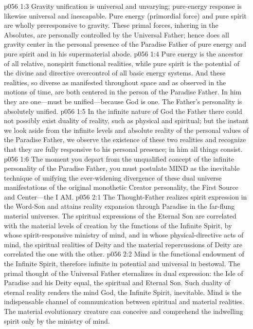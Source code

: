 \vs p056 1:3 Gravity unification is universal and unvarying; pure\hyp{}energy response is likewise universal and inescapable. Pure energy (primordial force) and pure spirit are wholly preresponsive to gravity. These primal forces, inhering in the Absolutes, are personally controlled by the Universal Father; hence does all gravity center in the personal presence of the Paradise Father of pure energy and pure spirit and in his supermaterial abode.
\pc \vs p056 1:4 Pure energy is the ancestor of all relative, nonspirit functional realities, while pure spirit is the potential of the divine and directive overcontrol of all basic energy systems. And these realities, so diverse as manifested throughout space and as observed in the motions of time, are both centered in the person of the Paradise Father. In him they are one---must be unified---because God is one. The Father’s personality is absolutely unified.
\vs p056 1:5 In the infinite nature of God the Father there could not possibly exist duality of reality, such as physical and spiritual; but the instant we look aside from the infinite levels and absolute reality of the personal values of the Paradise Father, we observe the existence of these two realities and recognize that they are fully responsive to his personal presence; in him all things consist.
\vs p056 1:6 The moment you depart from the unqualified concept of the infinite personality of the Paradise Father, you must postulate MIND as the inevitable technique of unifying the ever\hyp{}widening divergence of these dual universe manifestations of the original monothetic Creator personality, the First Source and Center---the I AM.
\vs p056 2:1 The Thought\hyp{}Father realizes spirit expression in the Word\hyp{}Son and attains reality expansion through Paradise in the far\hyp{}flung material universes. The spiritual expressions of the Eternal Son are correlated with the material levels of creation by the functions of the Infinite Spirit, by whose spirit\hyp{}responsive ministry of mind, and in whose physical\hyp{}directive acts of mind, the spiritual realities of Deity and the material repercussions of Deity are correlated the one with the other.
\vs p056 2:2 Mind is the functional endowment of the Infinite Spirit, therefore infinite in potential and universal in bestowal. The primal thought of the Universal Father eternalizes in dual expression: the Isle of Paradise and his Deity equal, the spiritual and Eternal Son. Such duality of eternal reality renders the mind God, the Infinite Spirit, inevitable. Mind is the indispensable channel of communication between spiritual and material realities. The material evolutionary creature can conceive and comprehend the indwelling spirit only by the ministry of mind.
